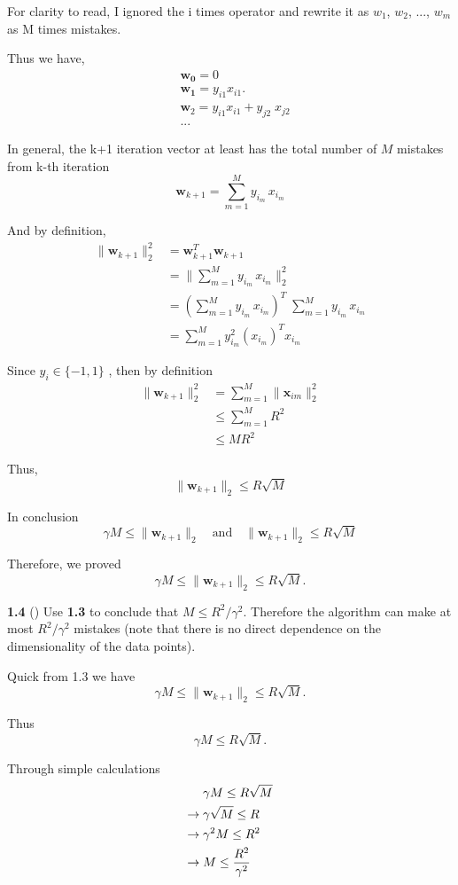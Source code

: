 For clarity to read, I ignored the i times operator and rewrite it as $w_1$, $w_2$, ..., $w_m$ as M times mistakes.

Thus we have,
\begin{align*}
&\mathbf{w_0} = 0\\
&\mathbf{w_1} = y_{i1} x_{i1}.\\
&\mathbf{w}_2 = y_{i1} x_{i1} +y_{j2} \; x_{j2}\\
&...
\end{align*}

In general, the k+1 iteration vector at least has the total number of $M$ mistakes from k-th iteration
\[
\mathbf{w}_{k+1} = \sum_{m=1}^{M} y_{i_m} \, x_{i_m}
\]

And by definition,
\begin{align*}
\| \mathbf{w}_{k+1} \|_2^2
&=\mathbf{w}_{k+1}^T \mathbf{w}_{k+1}\\
&= \| \sum_{m=1}^{M} y_{i_m} \, x_{i_m} \|_2^2\\
&= (\sum_{m=1}^{M} y_{i_m} \, x_{i_m})^T \; \sum_{m=1}^{M} y_{i_m} \, x_{i_m}\\
&= \sum_{m=1}^{M}  y_{i_m}^2 (x_{i_m})^T x_{i_m}
\end{align*}

Since $y_i \in \{-1, 1\}$ , then by definition
\begin{align*}
\| \mathbf{w}_{k+1} \|_2^2
&= \sum_{m=1}^{M} \| \mathbf{x}_{im} \|_2^2 \\
& \le \sum_{m=1}^{M} {R^2} \\
& \le MR^2
\end{align*}

Thus,
\[
\| \mathbf{w}_{k+1} \|_2 \le R \sqrt{M}
\]

In conclusion
\[
\gamma M \le \|\mathbf{w}_{k+1}\|_2 \quad \text{and} \quad \| \mathbf{w}_{k+1} \|_2 \le R \sqrt{M}
\]

Therefore, we proved
\[
\gamma M \leq \|\mathbf{w}_{k+1}\|_2 \leq R\sqrt{M}.
\]

\bigskip
\textbf{1.4} () Use \textbf{1.3} to conclude that $M \leq {R^2}/{\gamma^2}$. Therefore the algorithm can make at most ${R^2}/{\gamma^2}$ mistakes (note that there is no direct dependence on the dimensionality of the data points).

\bigskip
{}

Quick from 1.3 we have
\[
\gamma M \leq \|\mathbf{w}_{k+1}\|_2 \leq R\sqrt{M}.
\]

Thus
\[
\gamma M \leq R\sqrt{M}.
\]

Through simple calculations
\begin{align*}
&\gamma M \leq R\sqrt{M}\\
\rightarrow \; &\gamma \sqrt{M} \leq R\\
\rightarrow \; &\gamma^2 M \leq R^2 \\
\rightarrow \; & M \leq {R^2\over{\gamma^2}}
\end{align*}